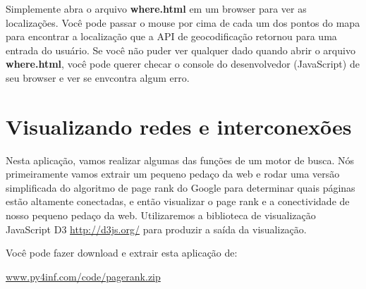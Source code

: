 Simplemente abra o arquivo {\bf where.html} em um browser para ver as
localizações. Você pode passar o mouse por cima de cada um dos pontos 
do mapa para encontrar a localização que a API de geocodificação retornou
para uma entrada do usuário. Se você não puder ver qualquer dado quando
abrir o arquivo {\bf where.html}, você pode querer checar o console do
desenvolvedor (JavaScript) de seu browser e ver se envcontra algum erro.

\section{Visualizando redes e interconexões}

Nesta aplicação, vamos realizar algumas das funções de um motor de busca.
Nós primeiramente vamos extrair um pequeno pedaço da web e rodar
uma versão simplificada do algoritmo de page rank do Google para determinar
quais páginas estão altamente conectadas, e então visualizar o page rank
e a conectividade de nosso pequeno pedaço da web.
Utilizaremos a biblioteca de visualização JavaScript D3 \url{http://d3js.org/}
para produzir a saída da visualização.

Você pode fazer download e extrair esta aplicação de:

\url{www.py4inf.com/code/pagerank.zip}

